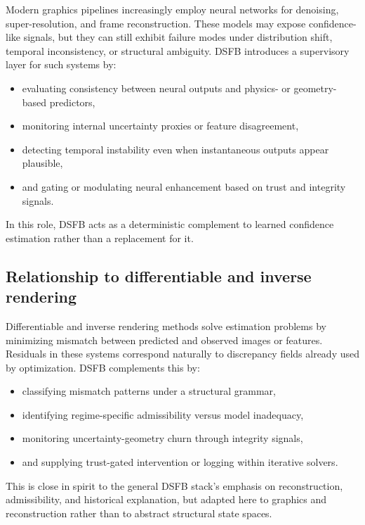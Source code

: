 \documentclass[11pt,letterpaper]{article}
\theoremstyle{gcresult}
\theoremstyle{definition}
\begin{document}
Modern graphics pipelines increasingly employ neural networks for denoising, super-resolution, and frame reconstruction. These models may expose confidence-like signals, but they can still exhibit failure modes under distribution shift, temporal inconsistency, or structural ambiguity. DSFB introduces a supervisory layer for such systems by:
\begin{itemize}[leftmargin=1.5em]
    \item evaluating consistency between neural outputs and physics- or geometry-based predictors,
    \item monitoring internal uncertainty proxies or feature disagreement,
    \item detecting temporal instability even when instantaneous outputs appear plausible,
    \item and gating or modulating neural enhancement based on trust and integrity signals.
\end{itemize}

In this role, DSFB acts as a deterministic complement to learned confidence estimation rather than a replacement for it.


\subsection{Relationship to differentiable and inverse rendering}

Differentiable and inverse rendering methods solve estimation problems by minimizing mismatch between predicted and observed images or features. Residuals in these systems correspond naturally to discrepancy fields already used by optimization. DSFB complements this by:
\begin{itemize}[leftmargin=1.5em]
    \item classifying mismatch patterns under a structural grammar,
    \item identifying regime-specific admissibility versus model inadequacy,
    \item monitoring uncertainty-geometry churn through integrity signals,
    \item and supplying trust-gated intervention or logging within iterative solvers.
\end{itemize}

This is close in spirit to the general DSFB stack’s emphasis on reconstruction, admissibility, and historical explanation, but adapted here to graphics and reconstruction rather than to abstract structural state spaces. 
\end{document}
